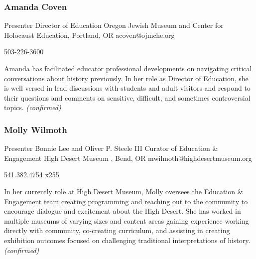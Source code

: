 \documentclass{report}
\begin{document}
              

              
                \subsubsection*{ Amanda  Coven }
                Presenter\newline
                Director of Education\newline
                Oregon Jewish Museum and Center for Holocaust Education, Portland, OR
                \newline
                acoven@ojmche.org\newline
                
                503-226-3600\newline

                Amanda has facilitated educator professional developments on navigating critical conversations about history previously. In her role as Director of Education, she is well versed in lead discussions with students and adult visitors and respond to their questions and comments on sensitive, difficult, and sometimes controversial topics.
                \emph{ (confirmed) }
              

              
                \subsubsection*{ Molly  Wilmoth }
                Presenter\newline
                Bonnie Lee and Oliver P. Steele III Curator of Education \& Engagement\newline
                High Desert Museum , Bend, OR
                \newline
                mwilmoth@highdesertmuseum.org\newline
                
                541.382.4754 x255\newline

                In her currently role at High Desert Museum, Molly oversees the Education \& Engagement team creating programming and reaching out to the community to encourage dialogue and excitement about the High Desert. She has worked in multiple museums of varying sizes and content areas gaining experience working directly with community, co-creating curriculum, and assisting in creating exhibition outcomes focused on challenging traditional interpretations of history.
                \emph{ (confirmed) }
              
\end{document}
